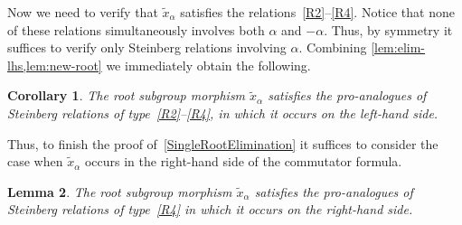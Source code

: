 \documentclass{article}
\numberwithin{equation}{section}
\newtheorem{lemma}{Lemma} \numberwithin{lemma}{section}
\newtheorem{corollary}[lemma]{Corollary}
\theoremstyle{definition}
\theoremstyle{remark}
\begin{document}
Now we need to verify that $\widetilde{x}_\alpha$ satisfies the relations~\eqref{R2}--\eqref{R4}.
Notice that none of these relations simultaneously involves both \(\alpha\) and \(-\alpha\).
Thus, by symmetry it suffices to verify only Steinberg relations involving \(\alpha\).
Combining \cref{lem:elim-lhs,lem:new-root} we immediately obtain the following.
\begin{corollary} \label{cor:elim-lhs}
 The root subgroup morphism $\widetilde{x}_\alpha$ satisfies the pro-analogues of Steinberg relations of type~\eqref{R2}--\eqref{R4}, in which it occurs on the left-hand side.
\end{corollary}

Thus, to finish the proof of~\cref{SingleRootElimination} it suffices to consider the case when $\widetilde{x}_\alpha$ occurs in the right-hand side of the commutator formula.
\begin{lemma} \label{lem:elim-rhs-r4}
 The root subgroup morphism $\widetilde{x}_\alpha$ satisfies the pro-analogues of Steinberg relations of type~\eqref{R4} in which it occurs on the right-hand side.
\end{lemma}
\end{document}
